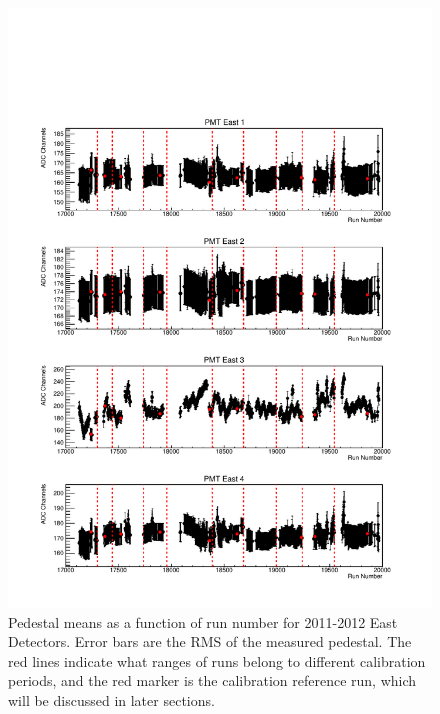 \begin{figure}[p]
\centering
\includegraphics[page=1,scale=0.8]{3-UCNAAnalysis/2011-2012_pedestals.pdf}
\caption{Pedestal means as a function of run number for 2011-2012 East Detectors. Error bars are the
  RMS of the measured pedestal. The red lines indicate what ranges of runs belong to
  different calibration periods, and the red marker is the calibration reference run,
  which will be discussed in later sections.}
 \label{fig:peds_timeDep}
\end{figure}

